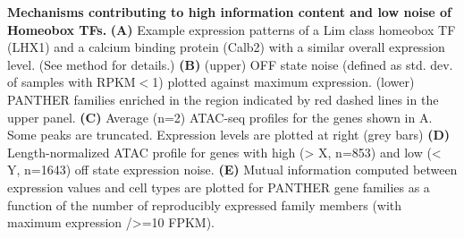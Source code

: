 \textbf{Mechanisms contributing to high information content and low noise of Homeobox TFs.}
\textbf{(A)} Example expression patterns of a Lim class homeobox TF (LHX1) and a calcium binding protein (Calb2) with a similar overall expression level. 
(See method for details.)
\textbf{(B)} (upper) OFF state noise (defined as std. dev. of samples with RPKM$<$1) plotted against maximum expression. (lower) PANTHER families enriched in the region indicated by red dashed lines in the upper panel.
\textbf{(C)} Average (n=2) ATAC-seq profiles for the genes shown in A. Some peaks are truncated. Expression levels are plotted at right (grey bars)
\textbf{(D)} Length-normalized ATAC profile for genes with high (> X, n=853) and low (< Y, n=1643) off state expression noise.
\textbf{(E)} Mutual information computed between expression values and cell types are plotted for PANTHER gene families as a function of the number of reproducibly expressed family members (with maximum expression />=10 FPKM). 
